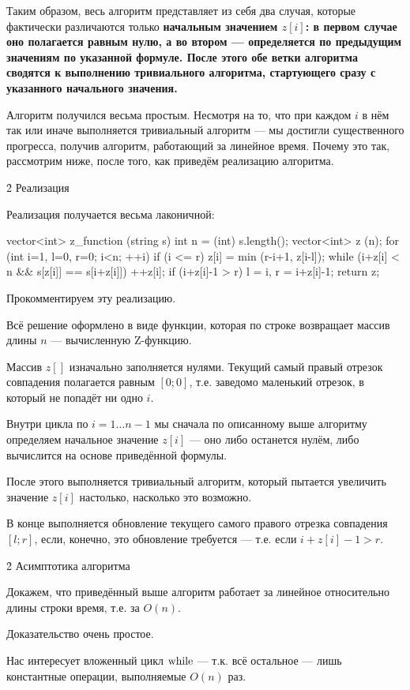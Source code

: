 Таким образом, весь алгоритм представляет из себя два случая, которые фактически различаются только \bf{начальным значением} $z[i]$: в первом случае оно полагается равным нулю, а во втором --- определяется по предыдущим значениям по указанной формуле. После этого обе ветки алгоритма сводятся к выполнению \bf{тривиального алгоритма}, стартующего сразу с указанного начального значения.

Алгоритм получился весьма простым. Несмотря на то, что при каждом $i$ в нём так или иначе выполняется тривиальный алгоритм --- мы достигли существенного прогресса, получив алгоритм, работающий за линейное время. Почему это так, рассмотрим ниже, после того, как приведём реализацию алгоритма.


\h2{ Реализация }

Реализация получается весьма лаконичной:

\code
vector<int> z_function (string s) {
	int n = (int) s.length();
	vector<int> z (n);
	for (int i=1, l=0, r=0; i<n; ++i) {
		if (i <= r)
			z[i] = min (r-i+1, z[i-l]);
		while (i+z[i] < n && s[z[i]] == s[i+z[i]])
			++z[i];
		if (i+z[i]-1 > r)
			l = i,  r = i+z[i]-1;
	}
	return z;
}
\endcode

Прокомментируем эту реализацию.

Всё решение оформлено в виде функции, которая по строке возвращает массив длины $n$ --- вычисленную Z-функцию.

Массив $z[]$ изначально заполняется нулями. Текущий самый правый отрезок совпадения полагается равным $[0;0]$, т.е. заведомо маленький отрезок, в который не попадёт ни одно $i$.

Внутри цикла по $i = 1 \ldots n-1$ мы сначала по описанному выше алгоритму определяем начальное значение $z[i]$ --- оно либо останется нулём, либо вычислится на основе приведённой формулы.

После этого выполняется тривиальный алгоритм, который пытается увеличить значение $z[i]$ настолько, насколько это возможно.

В конце выполняется обновление текущего самого правого отрезка совпадения $[l;r]$, если, конечно, это обновление требуется --- т.е. если $i+z[i]-1 > r$.


\h2{ Асимптотика алгоритма }

Докажем, что приведённый выше алгоритм работает за линейное относительно длины строки время, т.е. за $O (n)$.

Доказательство очень простое.

Нас интересует вложенный цикл $\rm while$ --- т.к. всё остальное --- лишь константные операции, выполняемые $O (n)$ раз.

